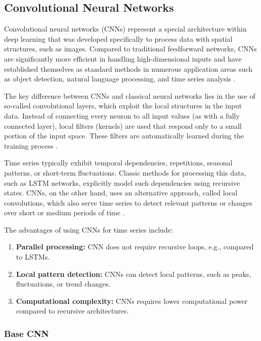 \subsection{Convolutional Neural Networks}
\label{chap:cnn}

Convolutional neural networks (CNNs) represent a special architecture within deep learning that was developed specifically to process data with spatial structures, such as images.
Compared to traditional feedforward networks, CNNs are significantly more efficient in handling high-dimensional inputs and have established themselves as standard methods in numerous application areas such as object detection, natural language processing, and time series analysis \cite{cnn-for-time-series}.

The key difference between CNNs and classical neural networks lies in the use of so-called convolutional layers, which exploit the local structures in the input data.
Instead of connecting every neuron to all input values (as with a fully connected layer), local filters (kernels) are used that respond only to a small portion of the input space.
These filters are automatically learned during the training process \cite{cnn-for-time-series}.

Time series typically exhibit temporal dependencies, repetitions, seasonal patterns, or short-term fluctuations.
Classic methods for processing this data, such as LSTM networks, explicitly model such dependencies using recursive states.
CNNs, on the other hand, uses an alternative approach, called local convolutions, which also serve time series to detect relevant patterns or changes over short or medium periods of time \cite{cnn-local-convolution}.

The advantages of using CNNs for time series include:

\begin{enumerate}
    \item \textbf{Parallel processing:} CNN does not require recursive loops, e.g., compared to LSTMs.
    \item \textbf{Local pattern detection:} CNNs can detect local patterns, such as peaks, fluctuations, or trend changes.
    \item \textbf{Computational complexity:} CNNs requires lower computational power compared to recursive architectures.
\end{enumerate}

\subsubsection{Base CNN}

